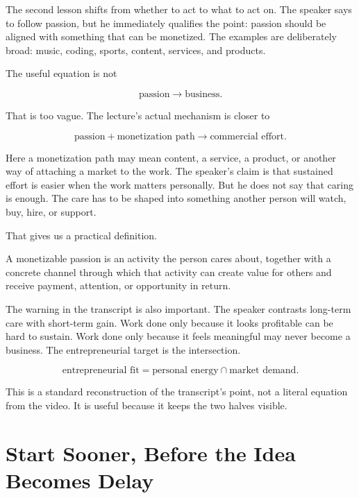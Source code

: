 The second lesson shifts from whether to act to what to act on. The speaker says to follow passion, but he immediately qualifies the point: passion should be aligned with something that can be monetized. The examples are deliberately broad: music, coding, sports, content, services, and products.

The useful equation is not

\begin{equation}
\text{passion} \longrightarrow \text{business}.
\end{equation}

That is too vague. The lecture's actual mechanism is closer to

\begin{equation}
\text{passion}+\text{monetization path}
\longrightarrow
\text{commercial effort}.
\end{equation}

Here a monetization path may mean content, a service, a product, or another way of attaching a market to the work. The speaker's claim is that sustained effort is easier when the work matters personally. But he does not say that caring is enough. The care has to be shaped into something another person will watch, buy, hire, or support.

That gives us a practical definition.

\begin{definition}
A monetizable passion is an activity the person cares about, together with a concrete channel through which that activity can create value for others and receive payment, attention, or opportunity in return.
\end{definition}

The warning in the transcript is also important. The speaker contrasts long-term care with short-term gain. Work done only because it looks profitable can be hard to sustain. Work done only because it feels meaningful may never become a business. The entrepreneurial target is the intersection.

\begin{equation}
\text{entrepreneurial fit}
=
\text{personal energy}
\cap
\text{market demand}.
\end{equation}

This is a standard reconstruction of the transcript's point, not a literal equation from the video. It is useful because it keeps the two halves visible.

\section{Start Sooner, Before the Idea Becomes Delay}

